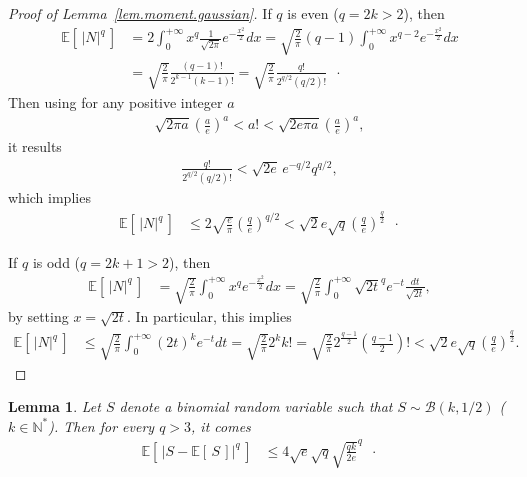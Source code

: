 \documentclass[twoside,11pt]{article}
\numberwithin{equation}{section}
\newtheorem{lem}{Lemma}[section]
\newcommand{\1}{\mathds{1}}%
\newcommand{\paren}[1]{\left( #1 \right)}
\newcommand{\croch}[1]{\left[\, #1 \,\right]}
\newcommand{\abs}[1]{\left\lvert #1 \right\rvert} %
\newcommand{\N}{\mathbb{N}}
\newcommand{\E}{\mathbb{E}}
\numberwithin{equation}{section}
\theoremstyle{plain}
\begin{document}
\begin{proof}[Proof of Lemma~\ref{lem.moment.gaussian}]

If $q$ is even ($q=2k>2$), then
\begin{align*}
  \E\croch{ \abs{N}^q } & = 2\int_{0}^{+\infty} x^q  \frac{1}{\sqrt{2\pi}} e^{-\frac{x^2}{2}} dx = \sqrt{\frac{2}{\pi}} (q-1) \int_{0}^{+\infty} x^{q-2}  e^{-\frac{x^2}{2}} dx \\
%
& = \sqrt{\frac{2}{\pi}} \frac{(q-1)!}{2^{k-1} (k-1)!} = \sqrt{\frac{2}{\pi}} \frac{q!}{2^{q/2} (q/2)!} \enspace\cdot
\end{align*}
%
Then using for any positive integer $a$
\begin{align*}
 \sqrt{2\pi a} \paren{ \frac{a}{e} }^a <  a ! < \sqrt{2e\pi a} \paren{ \frac{a}{e} }^a ,
\end{align*}
it results
\begin{align*}
  \frac{q!}{2^{q/2} (q/2)!} < \sqrt{2e}\, e^{-q/2} q^{q/2} ,
\end{align*}
which implies
\begin{align*}
  \E\croch{ \abs{N}^q } & \leq 2 \sqrt{\frac{e}{\pi}} \paren{ \frac{q}{e} }^{q/2} < \sqrt{2} e \sqrt{q} \paren{ \frac{q}{e} }^{\frac{q}{2}} \enspace \cdot
\end{align*}

If $q$ is odd ($q=2k+1>2$), then
\begin{align*}
  \E\croch{ \abs{N}^q } & = \sqrt{\frac{2}{\pi}} \int_{0}^{+\infty} x^q   e^{-\frac{x^2}{2}} dx = \sqrt{\frac{2}{\pi}} \int_{0}^{+\infty} \sqrt{2t}^q   e^{-t} \frac{dt}{\sqrt{2t}} ,
\end{align*}
by setting $x=\sqrt{2t}$.
%
In particular, this implies
\begin{align*}
  \E\croch{ \abs{N}^q } & \leq \sqrt{\frac{2}{\pi}} \int_{0}^{+\infty} \paren{2t}^k   e^{-t}  dt =
\sqrt{\frac{2}{\pi}} 2^k k! =  \sqrt{\frac{2}{\pi}} 2^{\frac{q-1}{2}} \paren{\frac{q-1}{2}}!  < \sqrt{2} e \sqrt{q} \paren{\frac{q}{e}}^{\frac{q}{2}} .
\end{align*}

\end{proof}



\medskip


\begin{lem}
\label{lem.binom.moment.upper.bound}
%
Let $S$ denote a binomial random variable such that $S \sim \mathcal{B}(k,1/2)$ ($k\in\N^*$).
%
Then for every $q>3$, it comes
\begin{align*}
  \E\croch{ \abs{ S-\E\croch{S} }^q } & \leq 4\sqrt{ e } \sqrt{q } \sqrt{\frac{qk}{2e}}^{q} \enspace\cdot
\end{align*}

\end{lem}
\end{document}
